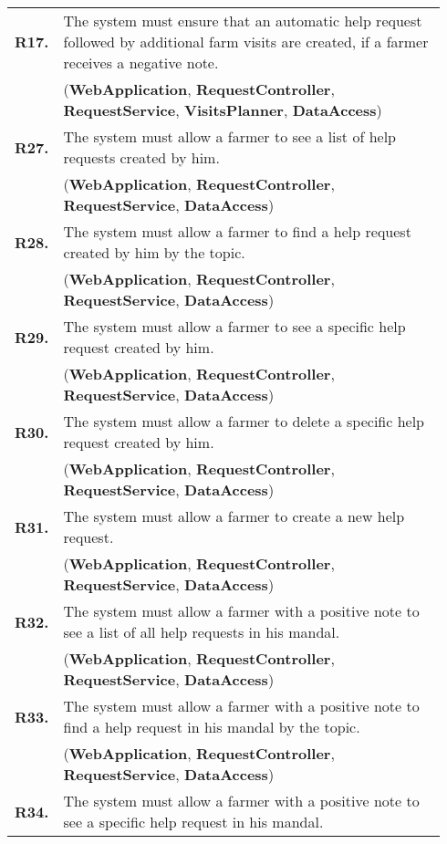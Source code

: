 \begin{longtable}{p{0.06\linewidth} p{0.88\linewidth}}
    \textbf{R17.} & The system must ensure that an automatic help request followed by additional farm visits are created, if a farmer receives a negative note.\\
    & (\textbf{WebApplication}, \textbf{RequestController}, \textbf{RequestService},
    \textbf{VisitsPlanner},
    \textbf{DataAccess})\\
	
	\textbf{R27.} & The system must allow a farmer to see a list of help requests created by him.\\
	& (\textbf{WebApplication}, \textbf{RequestController}, \textbf{RequestService}, \textbf{DataAccess})\\
	\textbf{R28.} & The system must allow a farmer to find a help request created by him by the topic.\\
	& (\textbf{WebApplication}, \textbf{RequestController}, \textbf{RequestService}, \textbf{DataAccess})\\
	\textbf{R29.} & The system must allow a farmer to see a specific help request created by him.\\
	& (\textbf{WebApplication}, \textbf{RequestController}, \textbf{RequestService}, \textbf{DataAccess})\\
	\textbf{R30.} & The system must allow a farmer to delete a specific help request created by him.\\
	& (\textbf{WebApplication}, \textbf{RequestController}, \textbf{RequestService}, \textbf{DataAccess})\\
	\textbf{R31.} & The system must allow a farmer to create a new help request.\\
	& (\textbf{WebApplication}, \textbf{RequestController}, \textbf{RequestService}, \textbf{DataAccess})\\
	\textbf{R32.} & The system must allow a farmer with a positive note to see a list of all help requests in his mandal.\\
	& (\textbf{WebApplication}, \textbf{RequestController}, \textbf{RequestService}, \textbf{DataAccess})\\
	\textbf{R33.} & The system must allow a farmer with a positive note to find a help request in his mandal by the topic.\\
	& (\textbf{WebApplication}, \textbf{RequestController}, \textbf{RequestService}, \textbf{DataAccess})\\
	\textbf{R34.} & The system must allow a farmer with a positive note to see a specific help request in his mandal.\\

\end{longtable}
